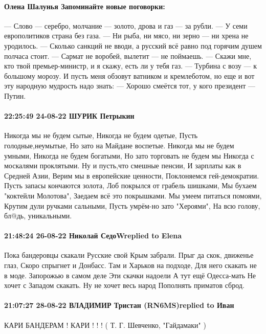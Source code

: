 \paragraph{Олена Шалунья Запоминайте новые поговорки:}

— Слово — серебро, молчание — золото, дрова и газ — за рубли.
— У семи европолитиков страна без газа.
— Ни рыба, ни мясо, ни зерно — ни хрена не уродилось.
— Сколько санкций не вводи, а русский всё равно под горячим душем полчаса стоит.
— Сармат не воробей, вылетит — не поймаешь.
— Скажи мне, кто твой премьер-министр, и я скажу, есть ли у тебя газ.
— Турбина с возу — к большому морозу.
И пусть меня обзовут ватником и кремлеботом, но еще и вот эту народную мудрость надо знать:
— Хорошо смеётся тот, у кого президент — Путин.

\paragraph{22:25:49 24-08-22 ШУРИК Петрыкин}

Никогда мы не будем сытые, Никогда не будем одетые,
Пусть голодные,неумытые, Но зато на Майдане воспетые.
Никогда мы не будем умными, Никогда не будем богатыми,
Но зато торговать не будем мы Никогда с москалями проклятыми.
Ну и пусть,что смешные пенсии, И зарплаты как в Средней Азии,
Верим мы в европейские ценности, Поклоняемся гей-демократии.
Пусть запасы кончаются золота, Лоб покрылся от грабель шишками,
Мы бухаем "коктейли Молотова", Заедаем всё это покрышками.
Мы умеем питаться помоями, Крутим дули ручками сальными,
Пусть умрём-но зато "Хероями", На всю голову, бл@дь, уникальными.


\paragraph{21:48:24 26-08-22 Николай СедоWreplied to Elena}

Пока бандеровцы скакали
Русские свой Крым забрали.
Прыг да скок, движенье глаз,
Скоро спрыгнет и Донбасс.
Там и Харьков на подходе,
Для него скакать не в моде.
Запорожью в самом деле
Эти скачки надоели
А тут ещё Одесса-мать
Не хочет с Западом скакать.
Ну не хочет весь народ
Пополнять приматов сброд.

\paragraph{21:07:27 28-08-22 ВЛАДИМИР Тристан (RN6MS)replied to Иван}

КАРИ БАНДЕРАМ !
КАРИ ! ! !
( Т. Г. Шевченко, "Гайдамаки" )


